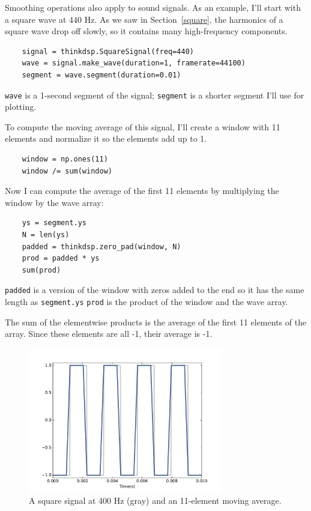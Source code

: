 \documentclass[12pt]{book}
\begin{document}
Smoothing operations also apply to sound signals.  As an example, I'll
start with a square wave at 440 Hz.  As we saw in
Section~\ref{square}, the harmonics of a square wave drop off
slowly, so it contains many high-frequency components.

\begin{verbatim}
    signal = thinkdsp.SquareSignal(freq=440)
    wave = signal.make_wave(duration=1, framerate=44100)
    segment = wave.segment(duration=0.01)
\end{verbatim}

{\tt wave} is a 1-second segment of the signal; {\tt segment}
is a shorter segment I'll use for plotting.

To compute the moving average of this signal, I'll create
a window with 11 elements and normalize it so the elements
add up to 1.

\begin{verbatim}
    window = np.ones(11)
    window /= sum(window)
\end{verbatim}

Now I can compute the average of the first 11 elements by
multiplying the window by the wave array:

\begin{verbatim}
    ys = segment.ys
    N = len(ys)
    padded = thinkdsp.zero_pad(window, N)
    prod = padded * ys
    sum(prod)
\end{verbatim}

{\tt padded} is a version of the window with zeros added to
the end so it has the same length as {\tt segment.ys}
{\tt prod} is the product of the window and the wave array.

The sum of the elementwise products is the average of the first 11
elements of the array.  Since these elements are all -1, their average
is -1.

\begin{figure}
\centerline{\includegraphics[height=2.5in]{figs/convolution2.pdf}}
\caption{A square signal at 400 Hz (gray) and an 11-element
moving average.}
\label{fig.convolution2}
\end{figure}
\end{document}
